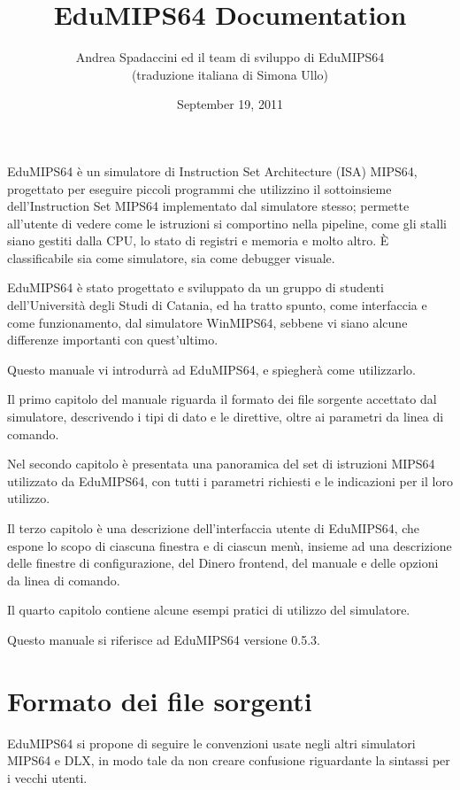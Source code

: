 \documentclass[letterpaper,10pt,english]{sphinxmanual}
\title{EduMIPS64 Documentation}
\date{September 19, 2011}
\author{Andrea Spadaccini ed il team di sviluppo di EduMIPS64\\(traduzione italiana di Simona Ullo)}
\begin{document}
\maketitle
\tableofcontents
{}\label{index::doc}


EduMIPS64 è un simulatore di Instruction Set Architecture (ISA) MIPS64,
progettato per eseguire piccoli programmi che utilizzino il sottoinsieme
dell'Instruction Set MIPS64 implementato dal simulatore stesso; permette
all'utente di vedere come le istruzioni si comportino nella pipeline, come gli
stalli siano gestiti dalla CPU, lo stato di registri e memoria e molto altro.
È classificabile sia come simulatore, sia come debugger visuale.

EduMIPS64 è stato progettato e sviluppato da un gruppo di studenti
dell'Università degli Studi di Catania, ed ha tratto spunto, come interfaccia
e come funzionamento, dal simulatore WinMIPS64, sebbene vi siano alcune
differenze importanti con quest'ultimo.

Questo manuale vi introdurrà ad EduMIPS64, e spiegherà come utilizzarlo.

Il primo capitolo del manuale riguarda il formato dei file sorgente accettato
dal simulatore, descrivendo i tipi di dato e le direttive, oltre ai parametri da
linea di comando.

Nel secondo capitolo è presentata una panoramica del set di istruzioni
MIPS64 utilizzato da EduMIPS64, con tutti i parametri richiesti e le indicazioni per
il loro utilizzo.

Il terzo capitolo è una descrizione dell'interfaccia utente di EduMIPS64, che
espone lo scopo di ciascuna finestra e di ciascun menù, insieme ad una
descrizione delle finestre di configurazione, del Dinero frontend, del manuale e
delle opzioni da linea di comando.

Il quarto capitolo contiene alcune esempi pratici di utilizzo del simulatore.

Questo manuale si riferisce ad EduMIPS64 versione 0.5.3.


\chapter{Formato dei file sorgenti}
\label{source-files-format:benvenuti-nella-documentazione-di-edumips64}\label{source-files-format:formato-dei-file-sorgenti}\label{source-files-format::doc}
EduMIPS64 si propone di seguire le convenzioni usate negli altri simulatori
MIPS64 e DLX, in modo tale da non creare confusione riguardante la sintassi
per i vecchi utenti.
\end{document}
